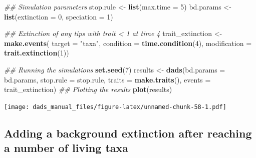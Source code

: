 \documentclass[]{book}
\newenvironment{Shaded}{\begin{snugshade}}{\end{snugshade}}
\newcommand{\CommentTok}[1]{\textcolor[rgb]{0.56,0.35,0.01}{\textit{#1}}}
\newcommand{\DataTypeTok}[1]{\textcolor[rgb]{0.13,0.29,0.53}{#1}}
\newcommand{\DecValTok}[1]{\textcolor[rgb]{0.00,0.00,0.81}{#1}}
\newcommand{\KeywordTok}[1]{\textcolor[rgb]{0.13,0.29,0.53}{\textbf{#1}}}
\newcommand{\NormalTok}[1]{#1}
\newcommand{\StringTok}[1]{\textcolor[rgb]{0.31,0.60,0.02}{#1}}
\begin{document}
\begin{Shaded}
\begin{Highlighting}[]
\CommentTok{## Simulation parameters}
\NormalTok{stop.rule <-}\StringTok{ }\KeywordTok{list}\NormalTok{(}\DataTypeTok{max.time =} \DecValTok{5}\NormalTok{)}
\NormalTok{bd.params <-}\StringTok{ }\KeywordTok{list}\NormalTok{(}\DataTypeTok{extinction =} \DecValTok{0}\NormalTok{, }\DataTypeTok{speciation =} \DecValTok{1}\NormalTok{)}

\CommentTok{## Extinction of any tips with trait < 1 at time 4}
\NormalTok{trait_extinction <-}\StringTok{ }\KeywordTok{make.events}\NormalTok{(}
                      \DataTypeTok{target =} \StringTok{"taxa"}\NormalTok{,}
                      \DataTypeTok{condition =} \KeywordTok{time.condition}\NormalTok{(}\DecValTok{4}\NormalTok{),}
                      \DataTypeTok{modification =} \KeywordTok{trait.extinction}\NormalTok{(}\DecValTok{1}\NormalTok{))}

\CommentTok{## Running the simulations}
\KeywordTok{set.seed}\NormalTok{(}\DecValTok{7}\NormalTok{)}
\NormalTok{results <-}\StringTok{ }\KeywordTok{dads}\NormalTok{(}\DataTypeTok{bd.params =}\NormalTok{ bd.params,}
                \DataTypeTok{stop.rule =}\NormalTok{ stop.rule,}
                \DataTypeTok{traits    =} \KeywordTok{make.traits}\NormalTok{(),}
                \DataTypeTok{events    =}\NormalTok{ trait_extinction)}
\CommentTok{## Plotting the results}
\KeywordTok{plot}\NormalTok{(results)}
\end{Highlighting}
\end{Shaded}

\texttt{[image: dads\_manual\_files/figure-latex/unnamed-chunk-58-1.pdf]}

\hypertarget{adding-a-background-extinction-after-reaching-a-number-of-living-taxa}{%
\subsection{Adding a background extinction after reaching a number of living taxa}\label{adding-a-background-extinction-after-reaching-a-number-of-living-taxa}}
\end{document}
